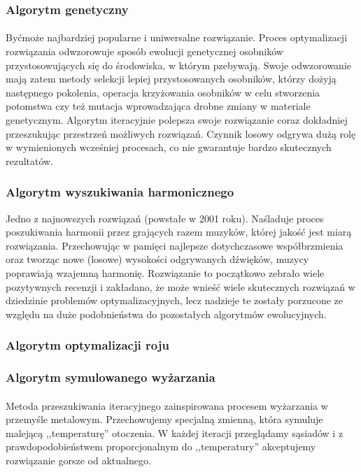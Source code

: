 \subsubsection{Algorytm genetyczny}
\paragraph{} Byćmoże najbardziej popularne i uniwersalne rozwiązanie. Proces optymalizacji rozwiązania odwzorowuje sposób ewolucji genetycznej osobników przystosowujących się do środowiska, w którym pzebywają. Swoje odwzorowanie mają zatem metody selekcji lepiej przystosowanych osobników, którzy dożyją następnego pokolenia, operacja krzyżowania osobników w celu stworzenia potomstwa czy też mutacja wprowadzająca drobne zmiany w materiale genetycznym. Algorytm iteracyjnie polepsza swoje rozwiązanie coraz dokładniej przeszukując przestrzeń możliwych rozwiązań. Czynnik losowy odgrywa dużą rolę w wymienionych wcześniej procesach, co nie gwarantuje bardzo skutecznych rezultatów.
\subsubsection{Algorytm wyszukiwania harmonicznego}
Jedno z najnowszych rozwiązań (powstałe w 2001 roku). Naśladuje proces poszukiwania harmonii przez grających razem muzyków, której jakość jest miarą rozwiązania. Przechowując w pamięci najlepsze dotychczasowe współbrzmienia oraz tworząc nowe (losowe) wysokości odgrywanych dźwięków, muzycy poprawiają wzajemną harmonię. Rozwiązanie to początkowo zebrało wiele pozytywnych recenzji i zakładano, że może wnieść wiele skutecznych rozwiązań w dziedzinie problemów optymalizacyjnych, lecz nadzieje te zostały porzucone ze względu na duże podobnieństwa do pozostałych algorytmów ewolucyjnych.
\subsubsection{Algorytm optymalizacji roju}

\subsubsection{Algorytm symulowanego wyżarzania}
\paragraph{} Metoda przeszukiwania iteracyjnego zainspirowana procesem wyżarzania w przemyśle metalowym. Przechowujemy specjalną zmienną, która symuluje malejącą ,,temperaturę'' otoczenia. W każdej iteracji przeglądamy sąsiadów i z prawdopodobieństwem proporcjonalnym do ,,temperatury'' akceptujemy rozwiązanie gorsze od aktualnego. 


